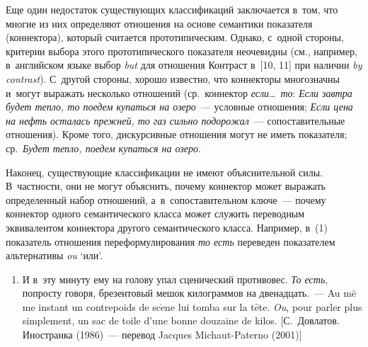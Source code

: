 \begin{multicols}{2}
   Еще один недостаток существующих классификаций заключается в~том, 
что многие из них определяют отношения на основе семантики показателя 
(коннектора), который считается прототипическим. Однако, с~одной стороны, 
критерии выбора этого прототипического показателя неочевидны (см., 
например, в~английском языке выбор \textit{but} для отношения Контраст 
в~[10, 11] при наличии \textit{by contrast}). С~другой стороны, хорошо 
известно, что коннекторы многозначны и~могут выражать несколько 
отношений (ср.\ коннектор \textit{если}\ldots\ \textit{то}: \textit{Если завтра 
будет тепло, то поедем купаться на озеро}~--- условные отношения; 
\textit{Если цена на нефть осталась прежней, то газ сильно подорожал}~--- 
сопоставительные отношения). Кроме того, дискурсивные отношения могут 
не иметь показателя; ср.\ \textit{Будет тепло, поедем купаться на озеро}.
   
   Наконец, существующие классификации не имеют объяснительной силы. 
В~част\-ности, они не могут объяснить, почему коннектор может выражать 
определенный набор отношений, а~в~сопоставительном ключе~--- почему 
коннектор одного семантического класса может служить переводным 
эквивалентом коннектора другого семантического класса. Например, в~(1) 
показатель отношения переформулирования \textit{то есть} переведен 
показателем альтернативы \textit{ou} `или'.
   \begin{enumerate}[(1)]
   \item И в~эту минуту ему на голову упал сценический противовес. \textit{То 
есть}, попросту говоря, брезентовый мешок килограммов на двенадцать.~--- 
Au m$\hat{\mbox{e}}$me instant un contrepoids de sc$\grave{\mbox{e}}$ne lui 
tomba sur la t$\hat{\mbox{e}}$te. \textit{Ou}, pour parler plus simplement, un sac de 
toile d'une bonne douzaine de kilos. [С.~Довлатов. Иностранка (1986)~--- перевод 
Jacques Michaut-Paterno (2001)]
   \end{enumerate}
   

\end{multicols}
